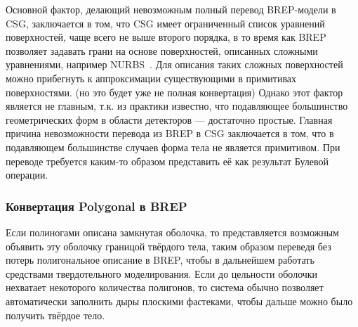 Основной фактор, делающий невозможным полный перевод BREP-модели в CSG, заключается в том, что CSG имеет ограниченный список уравнений поверхностей, чаще всего не выше второго порядка, в то время как BREP позволяет задавать грани на основе поверхностей, описанных сложными уравнениями, например NURBS~\cite{NURBS}. Для описания таких сложных поверхностей можно прибегнуть к аппроксимации существующими в примитивах поверхностями. (\todo но это будет уже не полная конвертация)
Однако этот фактор является не главным, т.к. из практики известно, что подавляющее большинство геометрических форм в области детекторов --- достаточно простые.
Главная причина невозможности перевода из BREP в CSG заключается в том, что в подавляющем большинстве случаев форма тела не является примитивом. При переводе требуется каким-то образом представить её как результат Булевой операции.




\subsubsection{Конвертация Polygonal в BREP}\label{sec:secPolyToBREP}

Если полиногами описана замкнутая оболочка, то представляется возможным объявить эту оболочку границой твёрдого тела, таким образом переведя без потерь полигональное описание в BREP, чтобы в дальнейшем работать средствами твердотельного моделирования. Если до цельности оболочки нехватает некоторого количества полигонов, то система обычно позволяет автоматически заполнить дыры плоскими фастеками, чтобы дальше можно было получить твёрдое тело.


